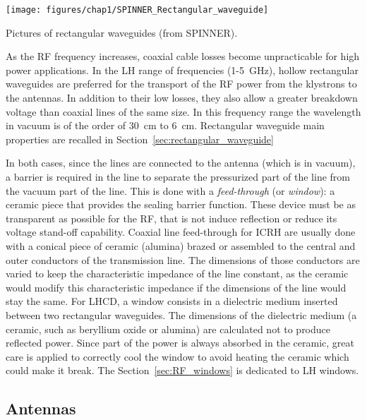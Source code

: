 \begin{marginfigure}
	\centering
	\texttt{[image: figures/chap1/SPINNER\_Rectangular\_waveguide]}
	\caption{Pictures of rectangular waveguides (from SPINNER).}
	\label{fig:spinnerrectangularwaveguide}
\end{marginfigure}

As the RF frequency increases, coaxial cable losses become unpracticable for high power applications. In the LH range of frequencies (1-5~\si{GHz}), hollow rectangular waveguides are preferred for the transport of the RF power from the klystrons to the antennas. In addition to their low losses, they also allow a greater breakdown voltage than coaxial lines of the same size. In this frequency range the wavelength in vacuum is of the order of 30~\si{cm} to 6~\si{cm}. Rectangular waveguide main properties are recalled in Section~\ref{sec:rectangular_waveguide}

In both cases, since the lines are connected to the antenna (which is in vacuum), a barrier is required in the line to separate the pressurized part of the line from the vacuum part of the line. This is done with a \textit{feed-through} (or \textit{window}): a ceramic piece that provides the sealing barrier function. These device must be as transparent as possible for the RF, that is not induce reflection or reduce its voltage stand-off capability. Coaxial line feed-through for ICRH are usually done with a conical piece of ceramic (alumina) brazed or assembled to the central and outer conductors of the transmission line. The dimensions of those conductors are varied to keep the characteristic impedance of the line constant, as the ceramic would modify this characteristic impedance if the dimensions of the line would stay the same. For LHCD, a window consists in a dielectric medium inserted between two rectangular waveguides. The dimensions of the dielectric medium (a ceramic, such as beryllium oxide or alumina) are calculated not to produce reflected power. Since part of the power is always absorbed in the ceramic, great care is applied to correctly cool the window to avoid heating the ceramic which could make it break. The Section~\ref{sec:RF_windows} is dedicated to LH windows.


\subsection{Antennas}\label{sec:RF_antennas}

